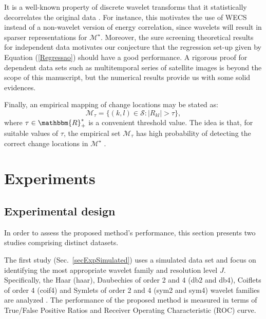 \documentclass[journal]{IEEEtran}
\begin{document}
It is a well-known property of discrete wavelet transforms that it statistically decorrelates the original data \cite{vidakovic1999statistical,morettin2017wavelets}. For instance, this motivates the use of WECS instead of a non-wavelet version of energy correlation, since wavelets will result in sparser representations for $\mathcal{M}^\star$. Moreover, the sure screening theoretical results for independent data motivates our conjecture that the regression set-up given by Equation (\ref{Regressao}) should have a good performance. A rigorous proof for dependent data sets such as multitemporal series of satellite images is beyond the scope of this manuscript, but the numerical results provide us with some solid evidences.


Finally, an empirical mapping of change locations may be stated as:
\begin{equation}
\mathcal{M}_{\tau} = \{(k,l) \in \mathcal{S} : |R_{kl}|>\tau\},
\label{E:def_Mtaud}
\end{equation}
where $\tau \in \mathbbm{R}_{+}^{*}$ is a convenient threshold value. The idea is that, for suitable values of $\tau$, the empirical set $\mathcal{M}_{\tau}$ has high probability of detecting the correct change locations in $\mathcal{M}^{\star}$ \cite{fan2020statistical}.




\section{Experiments}\label{secExperiments}

\subsection{Experimental design}\label{secExpDesign}

In order to assess the proposed method's performance, this section presents two studies comprising distinct datasets.

The first study (Sec.~\ref{secExpSimulated}) uses a simulated data set and focus on identifying the most appropriate wavelet family and resolution level $J$. Specifically, the Haar (haar), Daubechies of order 2 and 4 (db2 and db4), Coiflets of order 4 (coif4) and Symlets of order 2 and 4 (sym2 and sym4) wavelet families are analyzed \cite{BeylkinEA1991,Daubechies1992}. 
The performance of the proposed method is measured in terms of True/False Positive Ratios and Receiver Operating Characteristic (ROC) curve. 
\end{document}
